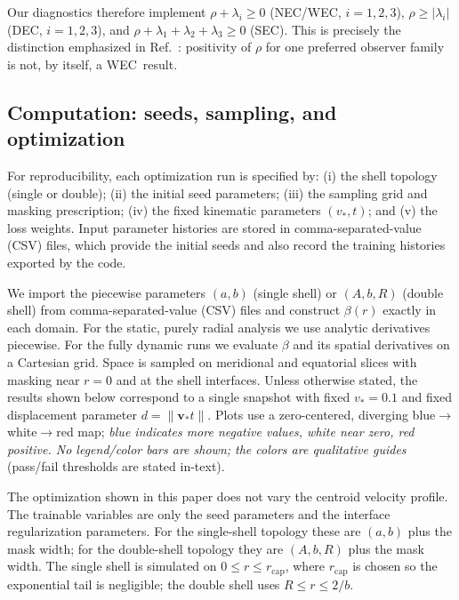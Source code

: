 \documentclass[11pt]{article}
\makeatletter
\newcommand{\@abbr}[1]{\ifmmode\mathrm{#1}\else\textsc{#1}\fi}
\newcommand{\WEC}{\@abbr{WEC}}
\newcommand{\NEC}{\@abbr{NEC}}
\newcommand{\SEC}{\@abbr{SEC}}
\newcommand{\DEC}{\@abbr{DEC}}
\makeatother
\begin{document}
Our diagnostics therefore implement $\rho+\lambda_i\ge 0$ (\NEC/\WEC, $i=1,2,3$), $\rho\ge |\lambda_i|$ (\DEC, $i=1,2,3$), and $\rho+\lambda_1+\lambda_2+\lambda_3\ge 0$ (\SEC). 
This is precisely the distinction emphasized in Ref.~\cite{Santiago:2021aup}: positivity of $\rho$ for one preferred observer family is not, by itself, a \WEC\ result.

\subsection{Computation: seeds, sampling, and optimization}
\label{sec:comp}
For reproducibility, each optimization run is specified by: (i) the shell topology (single or double); (ii) the initial seed parameters; (iii) the sampling grid and masking prescription; (iv) the fixed kinematic parameters $(v_*,t)$; and (v) the loss weights. Input parameter histories are stored in comma-separated-value (CSV) files, which provide the initial seeds and also record the training histories exported by the code.

We import the piecewise parameters $(a,b)$ (single shell) or $(A,b,R)$ (double shell) from comma-separated-value (CSV) files and construct $\beta(r)$ exactly in each domain. For the static, purely radial analysis we use analytic derivatives piecewise. For the fully dynamic runs we evaluate $\beta$ and its spatial derivatives on a Cartesian grid. Space is sampled on meridional and equatorial slices with masking near $r=0$ and at the shell interfaces. Unless otherwise stated, the results shown below correspond to a single snapshot with fixed $v_*=0.1$ and fixed displacement parameter $d=\|\mathbf v_* t\|$. Plots use a zero-centered, diverging blue$\to$white$\to$red map; \emph{blue indicates more negative values, white near zero, red positive. No legend/color bars are shown; the colors are qualitative guides} (pass/fail thresholds are stated in-text).

The optimization shown in this paper does not vary the centroid velocity profile. The trainable variables are only the seed parameters and the interface regularization parameters. For the single-shell topology these are $(a,b)$ plus the mask width; for the double-shell topology they are $(A,b,R)$ plus the mask width. The single shell is simulated on $0\le r\le r_{\text{cap}}$, where $r_{\text{cap}}$ is chosen so the exponential tail is negligible; the double shell uses $R\le r\le 2/b$.
\end{document}
